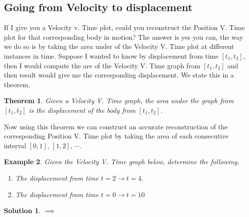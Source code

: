 \documentclass[12pt]{article}
\newcommand{\tx}[1]{\text{#1}}
\theoremstyle{break}
\newtheorem{thm}{Theorem}[subsection]
\newtheorem{ex}[thm]{Example}
\newtheorem*{soln}{Solution}
\begin{document}
\newpage
\subsection{Going from Velocity to displacement}
If I give you a Velocity v. Time plot, could you reconstruct the Position V. Time plot for that corresponding body in motion? The answer is yes you can, the way we do so is by taking the area under of the Velocity V. Time plot at different instances in time. Suppose I wanted to know by displacement from time $[t_1,t_2]$, then I would compute the are of the Velocity V. Time graph from $[t_1,t_2]$ and then result would give me the corresponding displacement. We state this in a theorem,
\begin{thm}
Given a Velocity V. Time graph, the area under the graph from $[t_1,t_2]$ is the displacement of the body from $[t_1,t_2]$.
\end{thm}
Now using this theorem we can construct an accurate reconstruction of the corresponding Position V. Time plot by taking the area of each consecutive interval $[0,1]$, $[1,2]$, $\cdots$. 
\begin{ex}
	Given the Velocity V. Time graph below, determine the following,
	\begin{enumerate}[label = (\alph*)]
		\item The displacement from time $t=2 \rightarrow t=4$.
		\item The displacement from time $t = 0 \rightarrow t = 10$
	\end{enumerate}




\end{ex}

\begin{soln}
$\implies$
\vspace*{15cm}
\end{soln}




	
\end{document}
